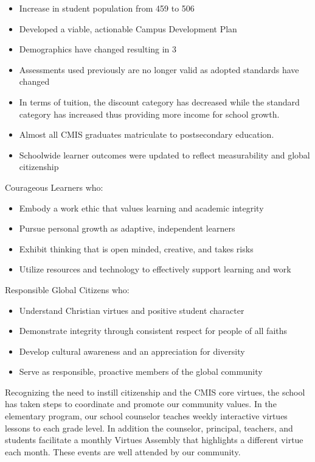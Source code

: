 
\begin{itemize}
\item Increase in student population from 459 to 506
\item Developed a viable, actionable Campus Development Plan
\item Demographics have changed resulting in 3%
\item Assessments used previously are no longer valid as adopted standards have changed
\item In terms of tuition, the discount category has decreased while the standard category has increased thus providing more income for school growth.
\item Almost all CMIS graduates matriculate to postsecondary education. 
\item Schoolwide learner outcomes were updated to reflect measurability and global citizenship
\end{itemize}

Courageous Learners who: 
\begin{itemize}
\item Embody a work ethic that values learning and academic integrity
\item Pursue personal growth as adaptive, independent learners
\item Exhibit thinking that is open minded, creative, and takes risks
\item Utilize resources and technology to effectively support learning and work
\end{itemize}

Responsible Global Citizens who:
\begin{itemize}
\item Understand Christian virtues and positive student character 
\item Demonstrate integrity through consistent respect for people of all faiths
\item Develop cultural awareness and an appreciation for diversity
\item Serve as responsible, proactive members of the global community
\end{itemize}

Recognizing the need to instill citizenship and the CMIS core virtues, the school has taken steps to coordinate and promote our community values.  In the elementary program, our school counselor teaches weekly interactive virtues lessons to each grade level.  In addition the counselor, principal, teachers, and students facilitate a monthly Virtues Assembly that highlights a different virtue each month. These events are well attended by our community.

